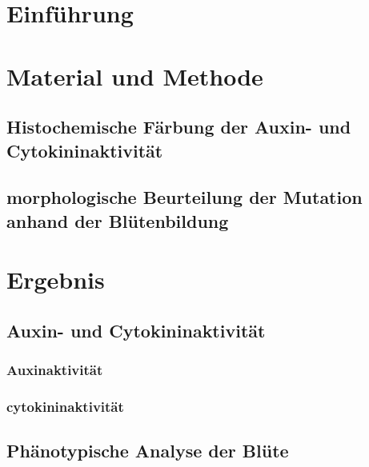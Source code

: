 \documentclass[10pt,a4paper]{article}
\begin{document}
	\tableofcontents
	
	
	
	\newpage
	\section{Einführung}	
	
	\section{Material und Methode}
	\subsection{Histochemische Färbung der Auxin- und Cytokininaktivität}
	\subsection{morphologische Beurteilung der Mutation anhand der Blütenbildung}
	
	\section{Ergebnis}
	
	\subsection{Auxin- und Cytokininaktivität}
		\subsubsection{Auxinaktivität}
		\subsubsection{cytokininaktivität}
	
	\subsection{Phänotypische Analyse der Blüte}
	
\end{document}
